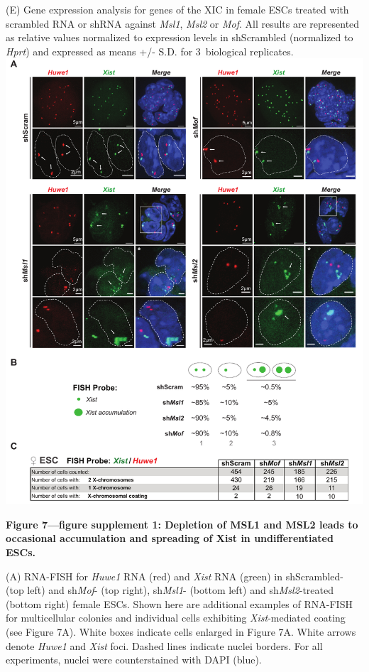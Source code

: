 \begin{footnotesize}
\begin{sffamily}
\begin{singlespacing}
(E) Gene expression analysis for genes of the XIC in female ESCs treated with scrambled RNA or shRNA against \textit{Msl1}, \textit{Msl2} or \textit{Mof}. All results are represented as relative values normalized to expression levels in shScrambled (normalized to \textit{Hprt}) and expressed as means +/- S.D. for 3~biological replicates.
\newpage
\includegraphics[width=.85\textwidth]{Figures/Appendix/Figure7_supplemental_figure1_scissored.pdf}

\textbf{Figure 7—figure supplement 1: Depletion of MSL1 and MSL2 leads to occasional accumulation and spreading of Xist in undifferentiated ESCs.}

(A) RNA-FISH for \textit{Huwe1} RNA (red) and \textit{Xist} RNA (green) in shScrambled- (top left) and sh\textit{Mof}- (top right), sh\textit{Msl1}- (bottom left) and sh\textit{Msl2}-treated (bottom right) female ESCs. Shown here are additional examples of RNA-FISH for multicellular colonies and individual cells exhibiting \textit{Xist}-mediated coating (see Figure 7A). White boxes indicate cells enlarged in Figure 7A. White arrows denote \textit{Huwe1} and \textit{Xist} foci. Dashed lines indicate nuclei borders. For all experiments, nuclei were coun\-ter\-stained with DAPI (blue).


\end{singlespacing}
\end{sffamily}
\end{footnotesize}
